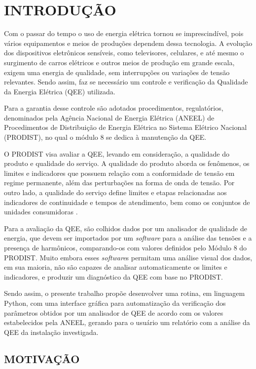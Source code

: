 \chapter{INTRODUÇÃO}

Com o passar do tempo o uso de energia elétrica tornou se imprescindível, pois vários equipamentos e meios de produções dependem dessa tecnologia. A evolução dos dispositivos eletrônicos sensíveis, como televisores, celulares, e até mesmo o surgimento de carros elétricos e outros meios de produção em grande escala, exigem uma energia de qualidade, sem interrupções ou variações de tensão relevantes. Sendo assim, faz se necessário um controle e verificação da Qualidade da Energia Elétrica (QEE) utilizada.

Para a garantia desse controle são adotados procedimentos, regulatórios, denominados pela Agência Nacional de Energia Elétrica (ANEEL) de Procedimentos de Distribuição de Energia Elétrica no Sistema Elétrico Nacional (PRODIST), no qual o módulo 8 se dedica à manutenção da QEE.

O PRODIST visa avaliar a QEE, levando em consideração, a qualidade do produto e qualidade do serviço. A qualidade do produto aborda os fenômenos, os limites e indicadores que possuem relação com a conformidade de tensão em regime permanente, além das perturbações na forma de onda de tensão. Por outro lado, a qualidade do serviço define limites e etapas relacionadas aos indicadores de continuidade e tempos de atendimento, bem como os conjuntos de unidades consumidoras \cite{ref:ANEEL2021}.

Para a avaliação da QEE, são colhidos dados por um analisador de qualidade de energia, que devem ser importados por um \textit{software} para a análise das tensões e a presença de harmônicos, comparando-os com valores definidos pelo Módulo 8 do PRODIST. Muito embora esses \textit{software}s permitam uma análise visual dos dados, em sua maioria, não são capazes de analisar automaticamente os limites e indicadores, e produzir um diagnóstico da QEE com base no PRODIST.

Sendo assim, o presente trabalho propõe desenvolver uma rotina, em linguagem Python, com uma interface gráfica para automatização da verificação dos parâmetros obtidos por um analisador de QEE de acordo com os valores estabelecidos pela ANEEL, gerando para o usuário um relatório com a análise da QEE da instalação investigada.

\section{MOTIVAÇÃO}

